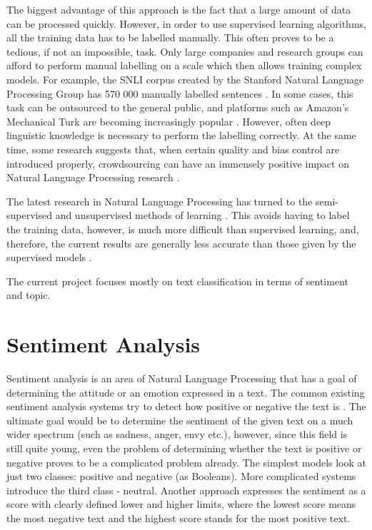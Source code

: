 The biggest advantage of this approach is the fact that a large amount of data can be processed quickly. However, in order to use supervised learning algorithms, all the training data has to be labelled manually. This often proves to be a tedious, if not an impossible, task. Only large companies and research groups can afford to perform manual labelling on a scale which then allows training complex models. For example, the SNLI corpus created by the Stanford Natural Language Processing Group has 570 000 manually labelled sentences \cite{ferrero2017compilig}. In some cases, this task can be outsourced to the general public, and platforms such as Amazon's Mechanical Turk are becoming increasingly popular \cite{callison2010creating}. However, often deep linguistic knowledge is necessary to perform the labelling correctly. At the same time, some research suggests that, when certain quality and bias control are introduced properly, crowdsourcing can have an immensely positive impact on Natural Language Processing research \cite{sabou2012crowdsourcing, snow2008cheap}.

The latest research in Natural Language Processing has turned to the semi-supervised and unsupervised methods of learning \cite{liang2005semi, turian2010word}. This avoids having to label the training data, however, is much more difficult than supervised learning, and, therefore, the current results are generally less accurate than those given by the supervised models \cite{lapata2005web}.

The current project focuses mostly on text classification in terms of sentiment and topic. 

\section{Sentiment Analysis}
\label{sec:sentiment_analysis}

Sentiment analysis is an area of Natural Language Processing that has a goal of determining the attitude or an emotion expressed in a text. The common existing sentiment analysis systems try to detect how positive or negative the text is \cite{yi2003sentiment}. The ultimate goal would be to determine the sentiment of the given text on a much wider spectrum (such as sadness, anger, envy etc.), however, since this field is still quite young, even the problem of determining whether the text is positive or negative proves to be a complicated problem already. The simplest models look at just two classes: positive and negative (as Booleans). More complicated systems introduce the third class - neutral. Another approach expresses the sentiment as a score with clearly defined lower and higher limits, where the lowest score means the most negative text and the highest score stands for the most positive text.

